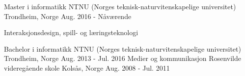 \begin{cventries}
  \cventry
    {Master i informatikk}
    {NTNU (Norges teknisk-naturvitenskapelige universitet)}
    {Trondheim, Norge}
    {Aug. 2016 - Nåværende}
    {
      \begin{cvitems}
        \item {Interaksjonsdesign, spill- og læringsteknologi}
      \end{cvitems}
    }
    \cventry
    {Bachelor i informatikk}
    {NTNU (Norges teknisk-naturvitenskapelige universitet)}
    {Trondheim, Norge}
    {Aug. 2013 - Jul. 2016}
    {}
    \cventry
    {Medier og kommunikasjon}
    {Rosenvilde videregående skole}
    {Kolsås, Norge}
    {Aug. 2008 - Jul. 2011}
    {}
\end{cventries}
